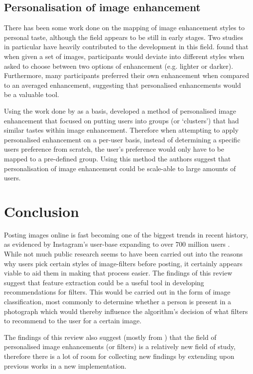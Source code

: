 \documentclass[a4paper,12pt]{report}
\begin{document}
    \subsection{Personalisation of image enhancement}
      There has been some work done on the mapping of image enhancement styles to personal taste, although the field appears to be still in early stages. Two studies in particular have heavily contributed to the development in this field. \cite{kang2010personalization} found that when given a set of images, participants would deviate into different styles when asked to choose between two options of enhancement (e.g. lighter or darker). Furthermore, many participants preferred their own enhancement when compared to an averaged enhancement, suggesting that personalised enhancements would be a valuable tool.

      Using the work done by \cite{kang2010personalization} as a basis, \cite{caicedo2011collaborative} developed a method of personalised image enhancement that focused on putting users into groups (or ‘clusters’) that had similar tastes within image enhancement. Therefore when attempting to apply personalised enhancement on a per-user basis, instead of determining a specific users preference from scratch, the user's preference would only have to be mapped to a pre-defined group. Using this method the authors suggest that personalisation of image enhancement could be scale-able to large amounts of users.

  \newpage

  \section{Conclusion}
    Posting images online is fast becoming one of the biggest trends in recent history, as evidenced by Instagram's user-base expanding to over 700 million users \citep{instagram2017users}. While not much public research seems to have been carried out into the reasons why users pick certain styles of image-filters before posting, it certainly appears viable to aid them in making that process easier.
    The findings of this review suggest that feature extraction could be a useful tool in developing recommendations for filters. This would be carried out in the form of image classification, most commonly to determine whether a person is present in a photograph which would thereby influence the algorithm's decision of what filters to recommend to the user for a certain image.

    The findings of this review also suggest (mostly from \cite{kang2010personalization,caicedo2011collaborative}) that the field of personalised image enhancements (or filters) is a relatively new field of study, therefore there is a lot of room for collecting new findings by extending upon previous works in a new implementation.
\end{document}
